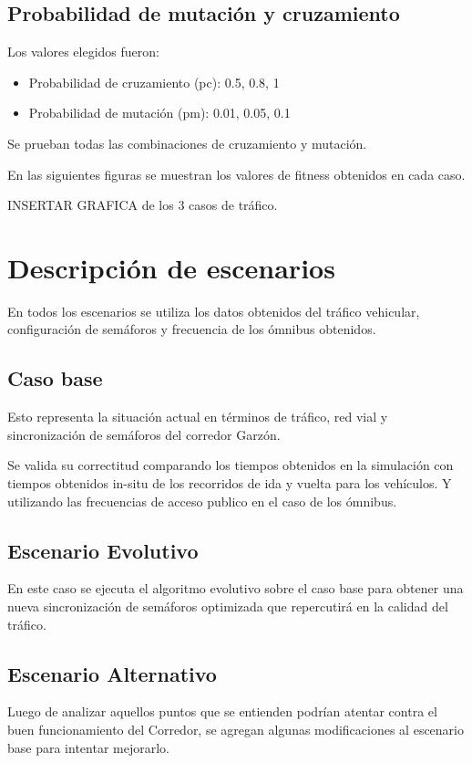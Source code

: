 \subsection{Probabilidad de mutación y cruzamiento}

Los valores elegidos fueron:

\begin{itemize}
	\item Probabilidad de cruzamiento (pc):  0.5, 0.8, 1
	\item Probabilidad de  mutación (pm):  0.01, 0.05, 0.1
\end{itemize}

Se prueban todas las combinaciones  de cruzamiento y mutación.

En las siguientes figuras se muestran los valores de fitness obtenidos en cada caso.


INSERTAR GRAFICA de los 3 casos de tráfico.






\section{Descripción de escenarios}
En todos los escenarios se utiliza los datos obtenidos del tráfico vehicular, configuración de semáforos y frecuencia de los ómnibus obtenidos. 

\subsection{Caso base}
Esto representa la situación actual en términos de tráfico, red vial y sincronización de semáforos del corredor Garzón. 

Se valida su correctitud comparando los tiempos obtenidos en la simulación con tiempos obtenidos in-situ de los recorridos de ida y vuelta para los vehículos. Y utilizando las frecuencias de acceso publico en el caso de los ómnibus.

\subsection{Escenario Evolutivo }
En este caso se ejecuta el algoritmo evolutivo sobre el caso base para obtener una nueva sincronización de semáforos optimizada que repercutirá en la calidad del tráfico.

\subsection{Escenario Alternativo}
Luego de analizar aquellos puntos que se entienden podrían atentar contra el buen funcionamiento del Corredor, se agregan algunas modificaciones al escenario base para intentar mejorarlo. 

